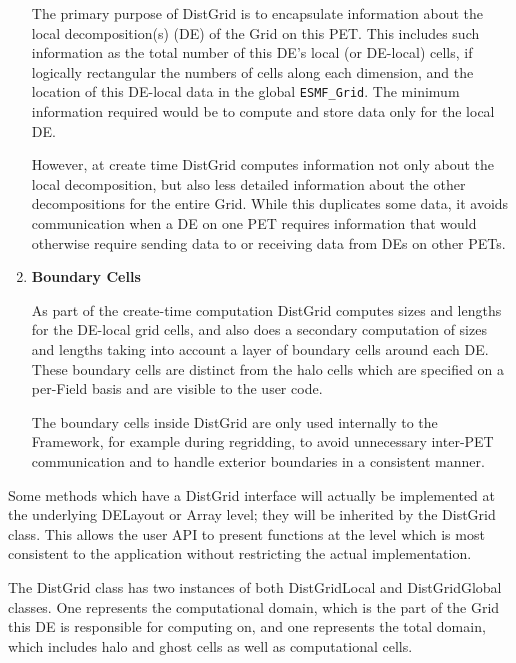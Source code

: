\begin{enumerate}
The primary purpose of DistGrid is to encapsulate information about the local
decomposition(s) (DE) of the Grid on this PET.  This includes such information
as the total number of this DE's local (or DE-local) cells, if logically
rectangular the numbers of cells along each dimension, and the location of this
DE-local data in the global {\tt ESMF\_Grid}.  The minimum information required
would be to compute and store data only for the local DE.

However, at create time DistGrid computes information not only about the
local decomposition, but also less detailed information about the other
decompositions for the entire Grid.  While this duplicates some data, it
avoids communication when a DE on one PET requires information that would
otherwise require sending data to or receiving data from DEs on other PETs. 

\item {\bf Boundary Cells}

As part of the create-time computation DistGrid computes sizes and lengths
for the DE-local grid cells, and also does a secondary computation 
of sizes and lengths taking into account a layer of boundary cells around 
each DE.  These boundary cells are distinct from the halo cells which are
specified on a per-Field basis and are visible to the user code.

The boundary cells inside DistGrid are only used internally to the Framework,
for example during regridding, to avoid unnecessary inter-PET communication and
to handle exterior boundaries in a consistent manner.

\end{enumerate}





Some methods which have a DistGrid interface will actually be
implemented at the underlying DELayout or Array level; they
will be inherited by the DistGrid class.  This allows the user
API to present functions at the level which is most consistent to the
application without restricting the actual implementation.


The DistGrid class has two instances of both DistGridLocal and
DistGridGlobal classes.  One represents the computational domain, which is the
part of the Grid this DE is responsible for computing on, and one represents
the total domain, which includes halo and ghost cells as well as computational
cells.





